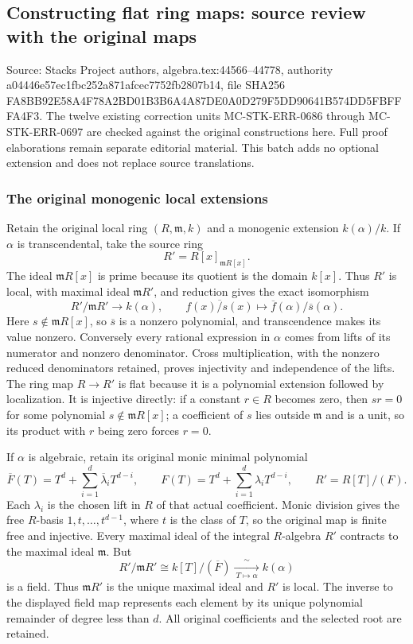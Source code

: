 \subsection{Constructing flat ring maps: source review with the original maps}\label{constructing-flat-ring-maps-source-review-with-the-original-maps}

Source: Stacks Project authors, algebra.tex:44566--44778, authority a04446e57ec1fbc252a871afcec7752fb2807b14, file SHA256 FA8BB92E58A4F78A2BD01B3B6A4A87DE0A0D279F5DD90641B574DD5FBFFFA4F3. The twelve existing correction units MC-STK-ERR-0686 through MC-STK-ERR-0697 are checked against the original constructions here. Full proof elaborations remain separate editorial material. This batch adds no optional extension and does not replace source translations.

\subsubsection{The original monogenic local extensions}\label{the-original-monogenic-local-extensions}

Retain the original local ring \((R,\mathfrak m,k)\) and a monogenic extension \(k(\alpha)/k\). If \(\alpha\) is transcendental, take the source ring \[
 R'=R[x]_{\mathfrak mR[x]}.
\] The ideal \(\mathfrak mR[x]\) is prime because its quotient is the domain \(k[x]\). Thus \(R'\) is local, with maximal ideal \(\mathfrak mR'\), and reduction gives the exact isomorphism \[
 R'/\mathfrak mR'\longrightarrow k(\alpha),\qquad
 \overline{f(x)/s(x)}\longmapsto \overline f(\alpha)/\overline s(\alpha).
\] Here \(s\notin\mathfrak mR[x]\), so \(\overline s\) is a nonzero polynomial, and transcendence makes its value nonzero. Conversely every rational expression in \(\alpha\) comes from lifts of its numerator and nonzero denominator. Cross multiplication, with the nonzero reduced denominators retained, proves injectivity and independence of the lifts. The ring map \(R\to R'\) is flat because it is a polynomial extension followed by localization. It is injective directly: if a constant \(r\in R\) becomes zero, then \(sr=0\) for some polynomial \(s\notin\mathfrak mR[x]\); a coefficient of \(s\) lies outside \(\mathfrak m\) and is a unit, so its product with \(r\) being zero forces \(r=0\).

If \(\alpha\) is algebraic, retain its original monic minimal polynomial \[
 \overline F(T)=T^d+\sum_{i=1}^{d}\overline\lambda_iT^{d-i},
 \qquad
 F(T)=T^d+\sum_{i=1}^{d}\lambda_iT^{d-i},
 \qquad R'=R[T]/(F).
\] Each \(\lambda_i\) is the chosen lift in \(R\) of that actual coefficient. Monic division gives the free \(R\)-basis \(1,t,\ldots,t^{d-1}\), where \(t\) is the class of \(T\), so the original map is finite free and injective. Every maximal ideal of the integral \(R\)-algebra \(R'\) contracts to the maximal ideal \(\mathfrak m\). But \[
 R'/\mathfrak mR'\cong k[T]/(\overline F)
       \xrightarrow[\ T\mapsto\alpha\ ]{\ \sim\ } k(\alpha)
\] is a field. Thus \(\mathfrak mR'\) is the unique maximal ideal and \(R'\) is local. The inverse to the displayed field map represents each element by its unique polynomial remainder of degree less than \(d\). All original coefficients and the selected root are retained.

